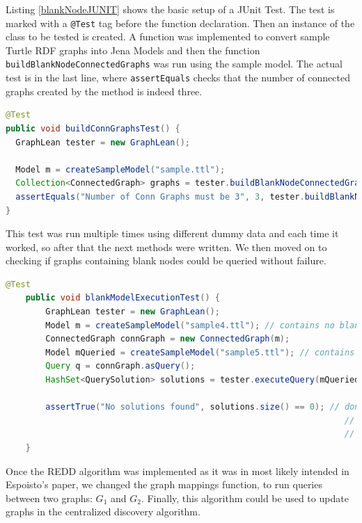 Listing \ref{blankNodeJUNIT} shows the basic setup of a JUnit Test. The test is marked with a \texttt{@Test} tag before the function declaration. Then an instance of the class to be tested is created. A function was implemented to convert sample Turtle RDF graphs into Jena Models and then the function \texttt{buildBlankNodeConnectedGraphs} was run using the sample model. The actual test is in the last line, where \texttt{assertEquals} checks that the number of connected graphs created by the method is indeed three.

\begin{lstlisting}[language=JAVA, caption={A very trivial test, that checks the correct number of connected graphs in a sample graph is correct for the sample data, in this case sample.ttl contains 3 connected subgraphs.}, label={blankNodeJUNIT}]
@Test
public void buildConnGraphsTest() {
  GraphLean tester = new GraphLean();

  Model m = createSampleModel("sample.ttl");
  Collection<ConnectedGraph> graphs = tester.buildBlankNodeConnectedGraphs(m);
  assertEquals("Number of Conn Graphs must be 3", 3, tester.buildBlankNodeConnectedGraphs(m).size());
}
\end{lstlisting}

This test was run multiple times using different dummy data and each time it worked, so after that the next methods were written. We then moved on to checking if graphs containing blank nodes could be queried without failure.


\begin{lstlisting}[language=JAVA, caption={This test checks if a model containign blank nodes can be queried without returning an error.}]
@Test
	public void blankModelExecutionTest() {
		GraphLean tester = new GraphLean();
		Model m = createSampleModel("sample4.ttl"); // contains no blank nodes
		ConnectedGraph connGraph = new ConnectedGraph(m);
		Model mQueried = createSampleModel("sample5.ttl"); // contains blanks
		Query q = connGraph.asQuery();
		HashSet<QuerySolution> solutions = tester.executeQuery(mQueried, q);

		assertTrue("No solutions found", solutions.size() == 0); // don't expect
																	// to get
																	// answers
	}
\end{lstlisting}

Once the REDD algorithm was implemented as it was in most likely intended in Espoisto's paper, we changed the graph mappings function, to run queries between two graphs: $G_1$ and $G_2$. Finally, this algorithm could be used to update graphs in the centralized discovery algorithm.

